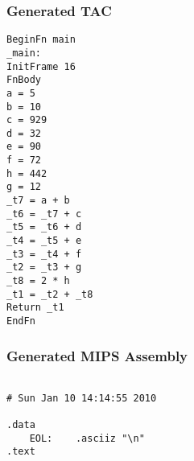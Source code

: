 \subsubsection{Generated TAC}
\begin{lstlisting}[showstringspaces=false,breaklines=true,backgroundcolor=\color{light-gray}, captionpos=b]
BeginFn main
_main:
InitFrame 16
FnBody
a = 5
b = 10
c = 929
d = 32
e = 90
f = 72
h = 442
g = 12
_t7 = a + b
_t6 = _t7 + c
_t5 = _t6 + d
_t4 = _t5 + e
_t3 = _t4 + f
_t2 = _t3 + g
_t8 = 2 * h
_t1 = _t2 + _t8
Return _t1
EndFn

\end{lstlisting}\subsubsection{Generated MIPS Assembly}
\begin{lstlisting}[showstringspaces=false,breaklines=true,backgroundcolor=\color{light-gray}, captionpos=b]
         
# Sun Jan 10 14:14:55 2010

.data
	EOL:	.asciiz "\n"
.text


\end{lstlisting}
